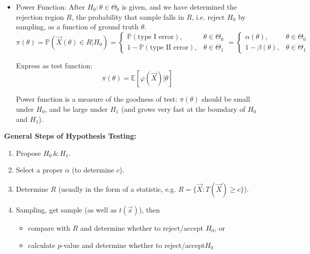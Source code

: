 \begin{itemize}[topsep = -3 pt]
            

        \item Power Function: After $H_0: \theta\in\Theta _0 $ is given, and we have determined the rejection region $ R $, the probability that sample falls in $ R $, i.e. reject $H_0$ by sampling, as a function of ground truth $ \theta  $.
        \begin{equation}
            \pi(\theta)=\mathbb{P}\left( \vec{X}(\theta )\in R|H_0 \right)= \begin{cases}
                \mathbb{P}(\text{type I error}),& \theta\in\Theta_0\\
                1-\mathbb{P}(\text{type II error}),& \theta\in\Theta_1
            \end{cases}
            =
            \begin{cases}
                \alpha(\theta),&\theta\in\Theta_0\\
                1-\beta(\theta),&\theta\in\Theta_1
            \end{cases}
        \end{equation}

        Express as test function:
        \begin{equation}
            \pi(\theta)=\mathbb{E}[\varphi(\vec{X})|\theta]
        \end{equation}

        Power function is a measure of the goodness of test: $\pi(\theta)$ should be small under $H_0$, and be large under $H_1$ (and grows very fast at the boundary of $ H_0 $ and $ H_1 $).
        \end{itemize}

        \begin{point}
            \textbf{General Steps of Hypothesis Testing:}
        \end{point}
        
        

        \begin{enumerate}[topsep=0pt]
            \item Propose $H_0\,\&\, H_1$.
            \item Select a proper $\alpha$ (to determine $c$).
            \item Determine $R$ (usually in the form of a statistic, e.g. $R=\{\vec{X}:T(\vec{X})\geq c\}$).
            
            \item Sampling, get sample (as well as $t(\vec{x})$), then 
            \begin{itemize}[topsep=-1pt,itemsep=-2pt]
                \item compare with $R$ and determine whether to reject/accept $H_0$, or
                \item calculate $ p $-value and determine whether to reject/accept$ H_0 $
            \end{itemize}
            
                
            

        \end{enumerate}

